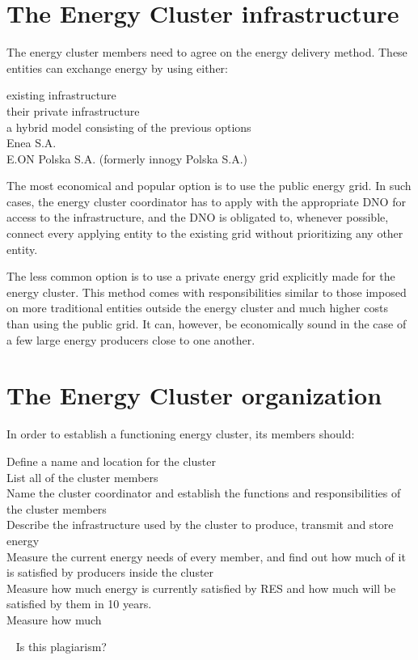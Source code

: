 \section{The Energy Cluster infrastructure}

\par The energy cluster members need to agree on the energy delivery method. These entities can exchange energy by using either: 
\begin{description}
  \item[existing infrastructure]
  \item[their private infrastructure]
  \item[a hybrid model consisting of the previous options]
  \item[Enea S.A.]
  \item[E.ON Polska S.A. (formerly innogy Polska S.A.)]
\end{description}
\par The most economical and popular option is to use the public energy grid. In such cases, the energy cluster coordinator has to apply with the appropriate DNO for access to the infrastructure, and the DNO is obligated to, whenever possible, connect every applying entity to the existing grid without prioritizing any other entity.
\par The less common option is to use a private energy grid explicitly made for the energy cluster. This method comes with responsibilities similar to those imposed on more traditional entities outside the energy cluster and much higher costs than using the public grid. It can, however, be economically sound in the case of a few large energy producers close to one another.

\section{The Energy Cluster organization}

\par In order to establish a functioning energy cluster, its members should:
\begin{description}
  \item[Define a name and location for the cluster]
  \item[List all of the cluster members]
  \item[Name the cluster coordinator and establish the functions and responsibilities of the cluster members]
  \item[Describe the infrastructure used by the cluster to produce, transmit and store energy]
  \item[Measure the current energy needs of every member, and find out how much of it is satisfied by producers inside the cluster]
  \item[Measure how much energy is currently satisfied by RES and how much will be satisfied by them in 10 years.]
  \item[Measure how much]
\end{description}
~ Is this plagiarism?

